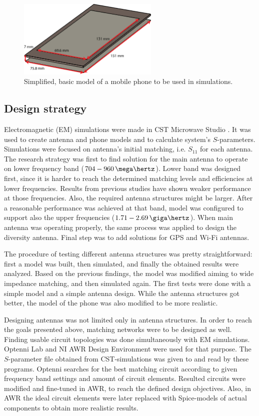 \begin{figure}[H]
    \centering
    \includegraphics[width=0.6\textwidth]{img/basic_structure.eps}
    \caption{Simplified, basic model of a mobile phone to be used in simulations.}
    \label{fig:basic_structure}
\end{figure}



\subsection{Design strategy}
\label{sec:process}
Electromagnetic (EM) simulations were made in CST Microwave Studio \cite{cst}. It was used to create antenna and phone models and to calculate system's $S$-parameters. Simulations were focused on antenna's initial matching, i.e. $S_{11}$ for each antenna. The research strategy was first to find solution for the main antenna to operate on lower frequency band ($704-960\,\mega\hertz$). Lower band was designed first, since it is harder to reach the determined matching levels and efficiencies at lower frequencies. Results from previous studies have shown weaker performance at those frequencies. Also, the required antenna structures might be larger. After a reasonable performance was achieved at that band, model was configured to support also the upper frequencies ($1.71-2.69\,\giga\hertz$). When main antenna was operating properly, the same process was applied to design the diversity antenna. Final step was to add solutions for GPS and Wi-Fi antennas.

The procedure of testing different antenna structures was pretty straightforward: first a model was built, then simulated, and finally the obtained results were analyzed. Based on the previous findings, the model was modified aiming to wide impedance matching, and then simulated again. The first tests were done with a simple model and a simple antenna design. While the antenna structures got better, the model of the phone was also modified to be more realistic.

Designing antennas was not limited only in antenna structures. In order to reach the goals presented above, matching networks were to be designed as well. Finding usable circuit topologies was done simultaneously with EM simulations. Optenni Lab \cite{optenni} and NI AWR Design Environment \cite{awr} were used for that purpose. The $S$-parameter file obtained from CST-simulations was given to and read by these programs. Optenni searches for the best matching circuit according to given frequency band settings and amount of circuit elements. Resulted circuits were modified and fine-tuned in AWR, to reach the defined design objectives. Also, in AWR the ideal circuit elements were later replaced with Spice-models of actual components to obtain more realistic results.
\clearpage